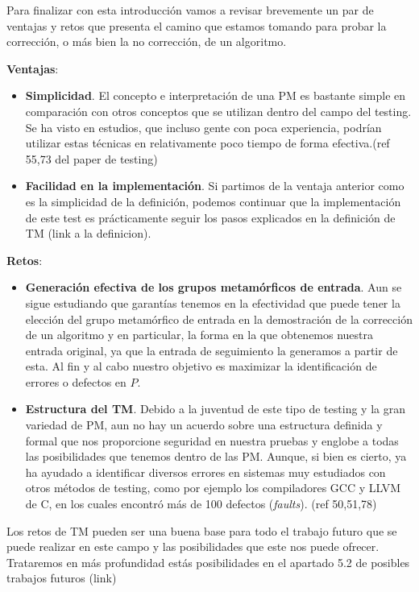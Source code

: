 Para finalizar con esta introducción vamos a revisar brevemente un par de ventajas y retos que presenta el camino que estamos tomando para probar la corrección, o más bien la no corrección, de un algoritmo. \newline

\textbf{Ventajas}:
\begin{itemize}
    \item \textbf{Simplicidad}. El concepto e interpretación de una PM es bastante simple en comparación con otros conceptos que se utilizan dentro del campo del testing. Se ha visto en estudios, que incluso gente con poca experiencia, podrían utilizar estas técnicas en relativamente poco tiempo de forma efectiva.(ref 55,73 del paper de testing)
    \item \textbf{Facilidad en la implementación}. Si partimos de la ventaja anterior como es la simplicidad de la definición, podemos continuar que la implementación de este test es prácticamente seguir los pasos explicados en la definición de TM (link a la definicion).
\end{itemize}

\vspace{10pt}

\textbf{Retos}:
\begin{itemize}
    \item \textbf{Generación efectiva de los grupos metamórficos de entrada}. Aun se sigue estudiando que garantías tenemos en la efectividad que puede tener la elección del grupo metamórfico de entrada en la demostración de la corrección de un algoritmo y en particular, la forma en la que obtenemos nuestra entrada original, ya que la entrada de seguimiento la generamos a partir de esta. Al fin y al cabo nuestro objetivo es maximizar la identificación de errores o defectos en $P$.
    \item \textbf{Estructura del TM}. Debido a la juventud de este tipo de testing y la gran variedad de PM, aun no hay un acuerdo sobre una estructura definida y formal que nos proporcione seguridad en nuestra pruebas y englobe a todas las posibilidades que tenemos dentro de las PM. Aunque, si bien es cierto, ya ha ayudado a identificar diversos errores en sistemas muy estudiados con otros métodos de testing, como por ejemplo los compiladores GCC y LLVM de C, en los cuales encontró más de 100 defectos (\textit{faults}). (ref 50,51,78)
\end{itemize}

Los retos de TM pueden ser una buena base para todo el trabajo futuro que se puede realizar en este campo y las posibilidades que este nos puede ofrecer. Trataremos en más profundidad estás posibilidades en el apartado 5.2 de posibles trabajos futuros (link)



